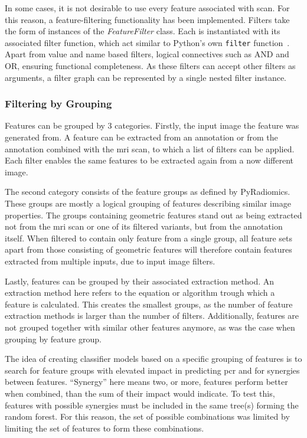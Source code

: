 In some cases, it is not desirable to use every feature associated with
 scan. For this reason, a feature-filtering functionality has been 
implemented. Filters take the form of instances of the \textit{FeatureFilter}
class. Each is instantiated with its associated filter function, which act 
similar to Python's own \texttt{filter} function~\cite{python_ref}. Apart from
value and name based filters, logical connectives such as AND and OR, 
ensuring functional completeness. As these filters can accept other filters as
arguments, a filter graph can be represented by a single nested filter instance.

\subsubsection{Filtering by Grouping}\label{sec:filtering_grouping}

Features can be grouped by 3 categories. Firstly, the input image the feature was 
generated from. A feature can be extracted from an annotation or from the 
annotation combined with the \ac{mri} scan, to which a list of filters can be 
applied. Each filter enables the same features to be extracted again from a now
different image. 

The second category consists of the feature groups as defined by PyRadiomics. These
groups are mostly a logical grouping of features describing similar image 
properties. The groups containing geometric features stand out as being 
extracted not from the \ac{mri} scan or one of its filtered variants, but from
the annotation itself. When filtered to contain only feature from a single 
group, all feature sets apart from those consisting of geometric features will
therefore contain features extracted from multiple inputs, due to input image 
filters.

Lastly, features can be grouped by their associated extraction method. An 
extraction method here refers to the equation or algorithm trough which a feature
is calculated. This creates the smallest groups, as the number of feature 
extraction methods is larger than the number of filters. 
Additionally, features are not grouped together with similar other features 
anymore, as was the case when grouping by feature group.

The idea of creating classifier models based on a specific grouping of features
is to search for feature groups with elevated impact in predicting \ac{pcr} and 
for synergies between features. \enquote{Synergy} here means two, or more, 
features perform better when combined, than the sum of their impact would 
indicate. To test this, features with possible synergies must be included in the
same tree(s) forming the random forest. For this reason, the set of possible 
combinations was limited by limiting the set of features to form these 
combinations. 


